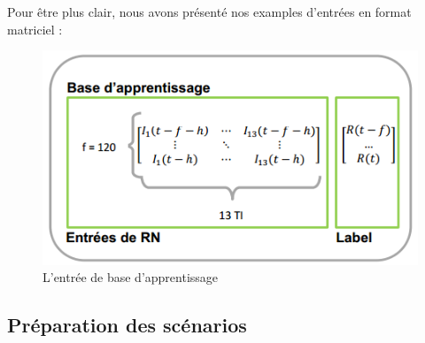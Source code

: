 Pour être plus clair, nous avons présenté nos examples d'entrées en format matriciel : 

\begin{figure}
\centering
\includegraphics[width=.9\linewidth, scale=0.2]
{plot/base.png}
\caption{L'entrée de base d'apprentissage}
\label{fig:base}
\end{figure}




\subsection{Préparation des scénarios}